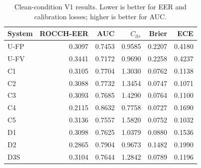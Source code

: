 \begin{table}[t]
\centering
\small
\caption{Clean-condition V1 results. Lower is better for EER and calibration losses; higher is better for AUC.}
\label{tab:v1-clean-results}
\begin{tabular}{lrrrrr}
\toprule
System & ROCCH-EER & AUC & $C_{llr}$ & Brier & ECE \\
\midrule
U-FP & 0.3097 & 0.7453 & 0.9585 & 0.2207 & 0.4180 \\
U-FV & 0.3441 & 0.7172 & 0.9690 & 0.2258 & 0.4237 \\
C1 & 0.3105 & 0.7704 & 1.3030 & 0.0762 & 0.1138 \\
C2 & 0.3088 & 0.7732 & 1.3454 & 0.0747 & 0.1071 \\
C3 & 0.3093 & 0.7685 & 1.4290 & 0.0764 & 0.1100 \\
C4 & 0.2115 & 0.8632 & 0.7758 & 0.0727 & 0.1690 \\
C5 & 0.3136 & 0.7557 & 1.5820 & 0.0752 & 0.1032 \\
D1 & 0.3098 & 0.7625 & 1.0379 & 0.0880 & 0.1536 \\
D2 & 0.2865 & 0.7904 & 0.9673 & 0.1482 & 0.1990 \\
D3S & 0.3104 & 0.7644 & 1.2842 & 0.0789 & 0.1196 \\
\bottomrule
\end{tabular}
\end{table}
